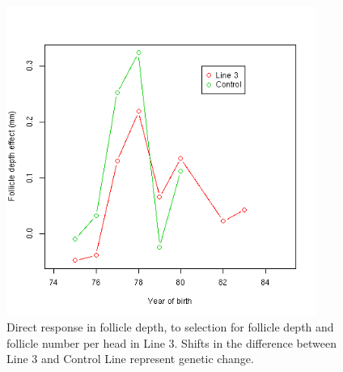 %

\begin{figure}[!htp]
  \centering
   \includegraphics[width=0.9\textwidth]{dgl3fd.png}
  \caption{Direct response in follicle depth, to selection for follicle depth and follicle number per head in Line 3. Shifts in the difference between Line 3 and Control Line represent genetic change.}
  \label{fig:dgl3fd}
\end{figure}

%

